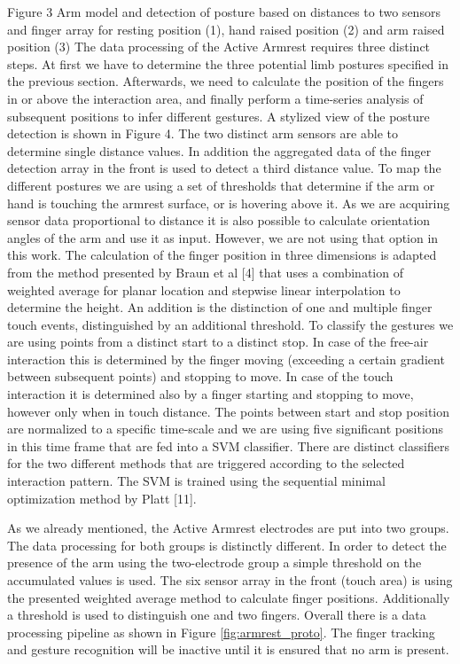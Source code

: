 Figure 3 Arm model and detection of posture based on distances to two sensors and finger array for resting position (1), hand raised position (2) and arm raised position (3)
The data processing of the Active Armrest requires three distinct steps. At first we have to determine the three potential limb postures specified in the previous section. Afterwards, we need to calculate the position of the fingers in or above the interaction area, and finally perform a time-series analysis of subsequent positions to infer different gestures. 
A stylized view of the posture detection is shown in Figure 4. The two distinct arm sensors are able to determine single distance values. In addition the aggregated data of the finger detection array in the front is used to detect a third distance value. To map the different postures we are using a set of thresholds that determine if the arm or hand is touching the armrest surface, or is hovering above it. As we are acquiring sensor data proportional to distance it is also possible to calculate orientation angles of the arm and use it as input. However, we are not using that option in this work.
The calculation of the finger position in three dimensions is adapted from the method presented by Braun et al [4] that uses a combination of weighted average for planar location and stepwise linear interpolation to determine the height. An addition is the distinction of one and multiple finger touch events, distinguished by an additional threshold.
To classify the gestures we are using points from a distinct start to a distinct stop. In case of the free-air interaction this is determined by the finger moving (exceeding a certain gradient between subsequent points) and stopping to move. In case of the touch interaction it is determined also by a finger starting and stopping to move, however only when in touch distance. The points between start and stop position are normalized to a specific time-scale and we are using five significant positions in this time frame that are fed into a SVM classifier. There are distinct classifiers for the two different methods that are triggered according to the selected interaction pattern. The SVM is trained using the sequential minimal optimization method by Platt [11].
	
As we already mentioned, the Active Armrest electrodes are put into two groups. The data processing for both groups is distinctly different. In order to detect the presence of the arm using the two-electrode group a simple threshold on the accumulated values is used. The six sensor array in the front (touch area) is using the presented weighted average method to calculate finger positions. Additionally a threshold is used to distinguish one and two fingers. Overall there is a data processing pipeline as shown in Figure \ref{fig:armrest_proto}. The finger tracking and gesture recognition will be inactive until it is ensured that no arm is present. 

